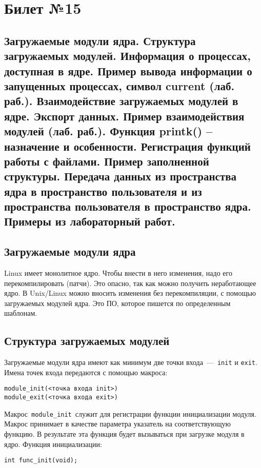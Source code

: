 \chapter{Билет №15}

\section*{Загружаемые модули ядра. Структура загружаемых модулей. Информация о процессах, доступная в ядре. Пример вывода информации о запущенных процессах, символ current (лаб. раб.). Взаимодействие загружаемых модулей в ядре. Экспорт данных. Пример взаимодействия модулей (лаб. раб.). Функция printk() – назначение и особенности. Регистрация функций работы с файлами. Пример заполненной структуры. Передача данных из пространства ядра в пространство пользователя и из пространства пользователя в пространство ядра. Примеры из лабораторный работ.}

\section{Загружаемые модули ядра}
Linux имеет монолитное ядро. Чтобы внести в него изменения, надо его перекомпилировать (патчи). Это опасно, так как можно получить неработающее ядро. В Unix/Linux можно вносить изменения без перекомпиляции, с помощью загружаемых модулей ядра. Это ПО, которое пишется по определенным шаблонам.

\section{Структура загружаемых модулей}

Загружаемые модули ядра имеют как минимум две точки входа~---~\texttt{init} и \texttt{exit}. Имена точек входа передаются с помощью макроса:

\begin{lstlisting}
module_init(<точка входа init>)
module_exit(<точка входа exit>)
\end{lstlisting}

Макрос \texttt{module\_init} служит для регистрации функции инициализации модуля. Макрос принимает в качестве параметра указатель на соответствующую функцию. В результате эта функция будет вызываться при загрузке модуля в ядро. Функция инициализации:

\begin{lstlisting}
int func_init(void);
\end{lstlisting}

